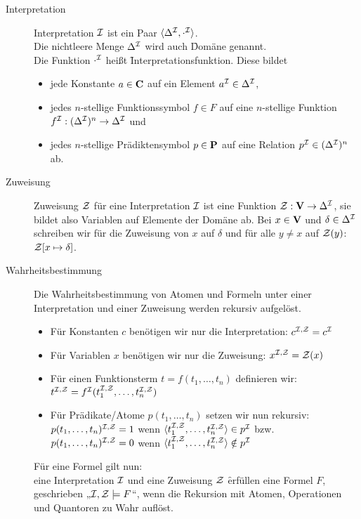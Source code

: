     \begin{description}
        \item[Interpretation] Interpretation $\mathcal{I}$  ist ein Paar $\langle\Delta^{\mathcal{I}}, \cdot^{\mathcal{I}}\rangle$.\\
            Die nichtleere Menge $\Delta^{\mathcal{I}}$ wird auch \f{Domäne} genannt. \\
            Die Funktion $\cdot^{\mathcal{I}}$ heißt \f{Interpretationsfunktion}. Diese bildet
            \begin{itemize}
                \item jede Konstante $a \in \textbf{C}$ auf ein Element $a^{\mathcal{I}} \in \Delta^{\mathcal{I}}$,
                \item jedes $n$-stellige Funktionssymbol $f \in F$ auf eine $n$-stellige Funktion $f^{\mathcal{I}}: (\Delta^{\mathcal{I}})^{n} \to \Delta^{\mathcal{I}}$ und
                \item jedes $n$-stellige Prädiktensymbol $p \in \textbf{P}$ auf eine Relation $p^{\mathcal{I}} \in (\Delta^{\mathcal{I}})^{n}$ ab.
            \end{itemize}

        \item[Zuweisung] Zuweisung $\mathcal{Z}$ für eine Interpretation $\mathcal{I}$ ist eine Funktion $\mathcal{Z}: \textbf{V} \to \Delta^{\mathcal{I}}$, sie bildet also Variablen auf Elemente der Domäne ab.
            Bei $x \in \textbf{V}$ und $\delta \in \Delta^{\mathcal{I}}$ schreiben wir für die Zuweisung von $x$ auf $\delta$ und für alle $y \neq x$ auf $\mathcal{Z} (y)$: $\mathcal{Z}[x \mapsto \delta]$.{}

        \item[Wahrheitsbestimmung] Die Wahrheitsbestimmung von Atomen und Formeln unter einer Interpretation und einer Zuweisung werden rekursiv aufgelöst.
            \begin{itemize}
                \item Für Konstanten $c$ benötigen wir nur die Interpretation: $c^{\mathcal{I},\mathcal{Z}} = c^{\mathcal{I}}$
                \item Für Variablen $x$ benötigen wir nur die Zuweisung: $x^{\mathcal{I},\mathcal{Z}} = \mathcal{Z}(x)$
                \item Für einen Funktionsterm $t = f(t_{1},\dots,t_{n})$ definieren wir: $t^{\mathcal{I}, \mathcal{Z}} = f^{\mathcal{I}}(t_{1}^{\mathcal{I}, \mathcal{Z}}, \dots, t_{n}^{\mathcal{I}, \mathcal{Z}})$
                \item Für Prädikate/Atome $p(t_{1},\dots,t_{n})$ setzen wir nun rekursiv: \\
                    $p(t_{1},\dots,t_{n})^{\mathcal{I},\mathcal{Z}} = 1$ wenn $\langle t_{1}^{\mathcal{I},\mathcal{Z}},\dots,t_{n}^{\mathcal{I},\mathcal{Z}} \rangle \in p^{\mathcal{I}}$ bzw. \\
                    $p(t_{1},\dots,t_{n})^{\mathcal{I},\mathcal{Z}} = 0$ wenn $\langle t_{1}^{\mathcal{I},\mathcal{Z}},\dots,t_{n}^{\mathcal{I},\mathcal{Z}} \rangle \notin p^{\mathcal{I}}$
            \end{itemize}

            Für eine Formel gilt nun: \\
            eine Interpretation $\mathcal{I}$ und eine Zuweisung $\mathcal{Z}$ \f{erfüllen} eine Formel $F$, geschrieben „$\mathcal{I}, \mathcal{Z} \models F$“, wenn die Rekursion mit Atomen, Operationen und Quantoren zu Wahr auflöst.
    \end{description}



